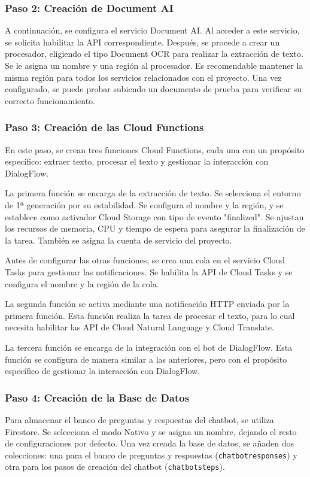 \subsubsection{Paso 2: Creación de Document AI}
A continuación, se configura el servicio Document AI. Al acceder a este servicio, se solicita habilitar la API correspondiente. Después, se procede a crear un procesador, eligiendo el tipo Document OCR para realizar la extracción de texto. Se le asigna un nombre y una región al procesador. Es recomendable mantener la misma región para todos los servicios relacionados con el proyecto. Una vez configurado, se puede probar subiendo un documento de prueba para verificar su correcto funcionamiento.

\subsubsection{Paso 3: Creación de las Cloud Functions}
En este paso, se crean tres funciones Cloud Functions, cada una con un propósito específico: extraer texto, procesar el texto y gestionar la interacción con DialogFlow.

La primera función se encarga de la extracción de texto. Se selecciona el entorno de 1ª generación por su estabilidad. Se configura el nombre y la región, y se establece como activador Cloud Storage con tipo de evento "finalized". Se ajustan los recursos de memoria, CPU y tiempo de espera para asegurar la finalización de la tarea. También se asigna la cuenta de servicio del proyecto.

Antes de configurar las otras funciones, se crea una cola en el servicio Cloud Tasks para gestionar las notificaciones. Se habilita la API de Cloud Tasks y se configura el nombre y la región de la cola.

La segunda función se activa mediante una notificación HTTP enviada por la primera función. Esta función realiza la tarea de procesar el texto, para lo cual necesita habilitar las API de Cloud Natural Language y Cloud Translate.

La tercera función se encarga de la integración con el bot de DialogFlow. Esta función se configura de manera similar a las anteriores, pero con el propósito específico de gestionar la interacción con DialogFlow.

\subsubsection{Paso 4: Creación de la Base de Datos}
Para almacenar el banco de preguntas y respuestas del chatbot, se utiliza Firestore. Se selecciona el modo Nativo y se asigna un nombre, dejando el resto de configuraciones por defecto. Una vez creada la base de datos, se añaden dos colecciones: una para el banco de preguntas y respuestas (\texttt{chatbotresponses}) y otra para los pasos de creación del chatbot (\texttt{chatbotsteps}).

